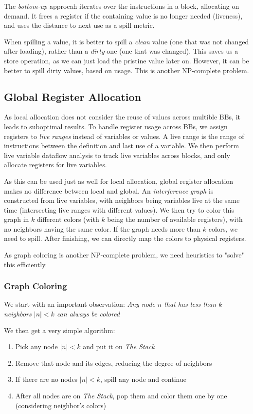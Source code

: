 \documentclass{article}
\begin{document}
The \emph{bottom-up} approcah iterates over the instructions in a block, allocating on demand.
It frees a register if the containing value is no longer needed (liveness), and uses the distance to next use as a spill metric.

\begin{keypointbox}
	When spilling a value, it is better to spill a \emph{clean} value (one that was not changed after loading), rather than a \emph{dirty} one (one that was changed).
	This saves us a store operation, as we can just load the pristine value later on.
	However, it can be better to spill dirty values, based on usage.
	This is another NP-complete problem.
\end{keypointbox}

\subsection{Global Register Allocation}
As local allocation does not consider the reuse of values across multible BBs, it leads to suboptimal results.
To handle register usage across BBs, we assign registers to \emph{live ranges} instead of variables or values.
A live range is the range of instructions between the definition and last use of a variable.
We then perform live variable dataflow analysis to track live variables across blocks, and only allocate registers for live variables.

As this can be used just as well for local allocation, global register allocation makes no difference between local and global.
An \emph{interference graph} is constructed from live variables, with neighbors being variables live at the same time (intersecting live ranges with different values).
We then try to color this graph in $k$ different colors (with $k$ being the number of available registers), with no neighbors having the same color.
If the graph needs more than $k$ colors, we need to spill.
After finishing, we can directly map the colors to physical registers.

As graph coloring is another NP-complete problem, we need heuristics to "solve" this efficiently.

\subsubsection{Graph Coloring}
We start with an important observation:
\emph{Any node $n$ that has less than $k$ neighbors $|n| < k$ can always be colored}

We then get a very simple algorithm:
\begin{enumerate}
	\item Pick any node $|n| < k$ and put it on \emph{The Stack}
	\item Remove that node and its edges, reducing the degree of neighbors
	\item If there are no nodes $|n| < k$, spill any node and continue
	\item After all nodes are on \emph{The Stack}, pop them and color them one by one (considering neighbor's colors)
\end{enumerate}
\end{document}
